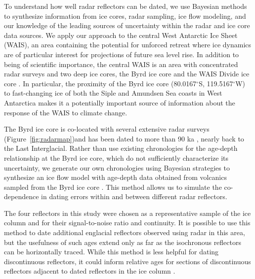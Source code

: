 To understand how well radar reflectors can be dated, we use Bayesian methods %
to synthesize information from ice cores, radar sampling, ice flow modeling, and our knowledge of the leading sources of uncertainty within the radar and ice core data sources. We apply our approach to the central West Antarctic Ice Sheet (WAIS), an area containing the potential for unforced retreat where ice dynamics are of particular interest for projections of future sea level rise. In addition to being of scientific importance, the central WAIS is an area with concentrated radar surveys and two deep ice cores, the Byrd ice core \citep{gow1968} and the WAIS Divide ice core \citep{buizert2015}. In particular, the proximity of the Byrd ice core (80.0167$^\circ$S, 119.5167$^\circ$W) to fast-changing ice of both the Siple and Amundsen Sea coasts in West Antarctica makes it a potentially important source of information about the response of the WAIS to climate change.

The Byrd ice core is co-located with several extensive radar surveys (Figure~\ref{fig:radarmap})and has been dated to more than 90 ka \citep{blunier2001}, nearly back to the Last Interglacial. Rather than use existing chronologies for the age-depth relationship at the Byrd ice core, which do not sufficiently characterize its uncertainty, we generate our own chronologies using Bayesian strategies to synthesize an ice flow model with age-depth data obtained from volcanics sampled from the Byrd ice core \citep{gow1968,gow1970,hammer1997}. This method allows us to simulate the co-dependence in dating errors within and between different radar reflectors.

The four reflectors in this study were chosen as a representative sample of the ice column and for their signal-to-noise ratio and continuity. It is possible to use this method to date additional englacial reflectors observed using radar in this area, but the usefulness of such ages extend only as far as the isochronous reflectors can be horizontally traced. While this method is less helpful for dating discontinuous reflectors, it could inform relative ages for sections of discontinuous reflectors adjacent to dated reflectors in the ice column  \citep[e.g.][]{macgregor2015}.

